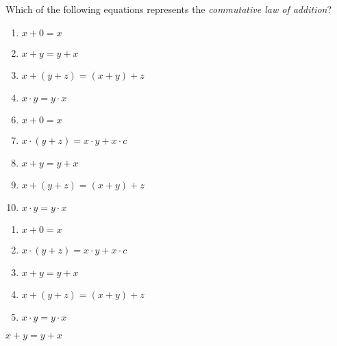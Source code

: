 



 Which of the following equations represents the \textit{commutative law of addition}?


\ifsat
	\begin{enumerate}[label=\Alph*)]
		\item   $x+0=x$
		\item  $x+y=y+x$%
		\item  $x+(y+z)=(x+y)+z$
		\item   $x\cdot y = y \cdot x$
	\end{enumerate}
\else
\fi

\ifacteven
	\begin{enumerate}[label=\textbf{\Alph*.},itemsep=\fill,align=left]
		\setcounter{enumii}{5}
		\item   $x+0=x$
		\item  $x\cdot(y+z)=x\cdot y + x\cdot c$
		\item  $x+y=y+x$%
		\addtocounter{enumii}{1}
		\item  $x+(y+z)=(x+y)+z$
		\item   $x\cdot y = y \cdot x$
	\end{enumerate}
\else
\fi

\ifactodd
	\begin{enumerate}[label=\textbf{\Alph*.},itemsep=\fill,align=left]
		\item   $x+0=x$
		\item  $x\cdot(y+z)=x\cdot y + x\cdot c$
		\item  $x+y=y+x$%
		\item  $x+(y+z)=(x+y)+z$
		\item   $x\cdot y = y \cdot x$
	\end{enumerate}
\else
\fi

\ifgridin
  $x+y=y+x$%
		
\else
\fi

